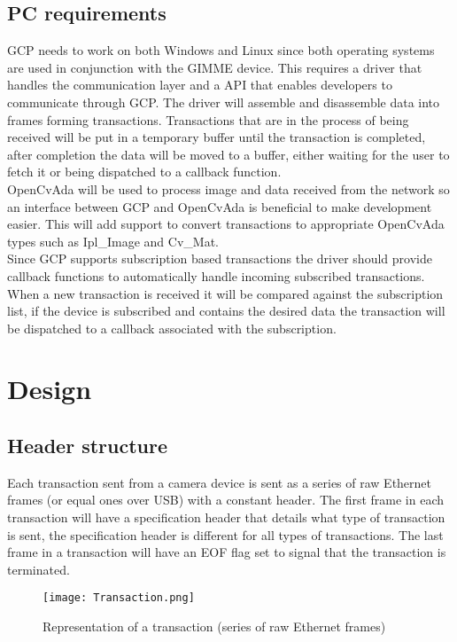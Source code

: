 \subsection{PC requirements}
GCP needs to work on both Windows and Linux since both operating systems are used in conjunction with the GIMME device. This requires a driver that handles the communication layer and a API that enables developers to communicate through GCP. The driver will assemble and disassemble data into frames forming transactions. Transactions that are in the process of being received will be put in a temporary buffer until the transaction is completed, after completion the data will be moved to a buffer, either waiting for the user to fetch it or being dispatched to a callback function.
\\
OpenCvAda will be used to process image and data received from the network so an interface between GCP and OpenCvAda is beneficial to make development easier. This will add support to convert transactions to appropriate OpenCvAda types such as Ipl_Image and Cv_Mat.
\\
Since GCP supports subscription based transactions the driver should provide callback functions to automatically handle incoming subscribed transactions. When a new transaction is received it will be compared against the subscription list, if the device is subscribed and contains the desired data the transaction will be dispatched to a callback associated with the subscription.

\section{Design}
\subsection{Header structure}
Each transaction sent from a camera device is sent as a series of raw Ethernet frames (or equal ones over USB) with a constant header. The first frame in each transaction will have a specification header that details what type of transaction is sent, the specification header is different for all types of transactions. The last frame in a transaction will have an EOF flag set to signal that the transaction is terminated.

\begin{figure}
\centering
\texttt{[image: Transaction.png]}
\caption{Representation of a transaction (series of raw Ethernet frames)}
\label{fig:Transaction}
\end{figure}

